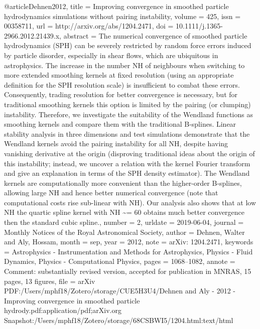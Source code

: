 {@article{Dehnen2012,
	title = {Improving convergence in smoothed particle hydrodynamics simulations without pairing instability},
	volume = {425},
	issn = {00358711},
	url = {http://arxiv.org/abs/1204.2471},
	doi = {10.1111/j.1365-2966.2012.21439.x},
	abstract = {The numerical convergence of smoothed particle hydrodynamics (SPH) can be severely restricted by random force errors induced by particle disorder, especially in shear flows, which are ubiquitous in astrophysics. The increase in the number NH of neighbours when switching to more extended smoothing kernels at fixed resolution (using an appropriate definition for the SPH resolution scale) is insufficient to combat these errors. Consequently, trading resolution for better convergence is necessary, but for traditional smoothing kernels this option is limited by the pairing (or clumping) instability. Therefore, we investigate the suitability of the Wendland functions as smoothing kernels and compare them with the traditional B-splines. Linear stability analysis in three dimensions and test simulations demonstrate that the Wendland kernels avoid the pairing instability for all NH, despite having vanishing derivative at the origin (disproving traditional ideas about the origin of this instability; instead, we uncover a relation with the kernel Fourier transform and give an explanation in terms of the SPH density estimator). The Wendland kernels are computationally more convenient than the higher-order B-splines, allowing large NH and hence better numerical convergence (note that computational costs rise sub-linear with NH). Our analysis also shows that at low NH the quartic spline kernel with NH {\textasciitilde}= 60 obtains much better convergence then the standard cubic spline.},
	number = {2},
	urldate = {2019-06-04},
	journal = {Monthly Notices of the Royal Astronomical Society},
	author = {Dehnen, Walter and Aly, Hossam},
	month = sep,
	year = {2012},
	note = {arXiv: 1204.2471},
	keywords = {Astrophysics - Instrumentation and Methods for Astrophysics, Physics - Fluid Dynamics, Physics - Computational Physics},
	pages = {1068--1082},
	annote = {Comment: substantially revised version, accepted for publication in MNRAS, 15 pages, 13 figures},
	file = {arXiv PDF:/Users/mphf18/Zotero/storage/CUE5H3U4/Dehnen and Aly - 2012 - Improving convergence in smoothed particle hydrody.pdf:application/pdf;arXiv.org Snapshot:/Users/mphf18/Zotero/storage/68CSBWI5/1204.html:text/html}
}

}
